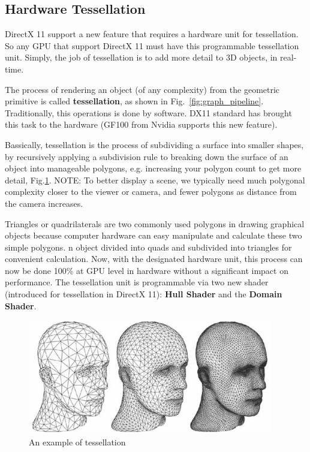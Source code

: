 \subsection{Hardware Tessellation}
\label{sec:tessellation}

DirectX 11 support a new feature that requires a hardware unit for tessellation.
So any GPU that support DirectX 11 must have this programmable tessellation
unit. Simply, the job of tessellation is to add more detail to 3D objects, in
real-time.

\begin{framed}
  The process of rendering an object (of any complexity) from the
  geometric primitive is called {\bf tessellation}, as shown in
  Fig.~\ref{fig:graph_pipeline}. Traditionally, this operations is
  done by software.  DX11 standard has brought this task to the
  hardware (GF100 from Nvidia supports this new feature).
\end{framed}

Bassically, tessellation is the process of subdividing a surface into smaller
shapes, by recursively applying a subdivision rule to breaking down the surface
of an object into manageable polygons, e.g. increasing your polygon count to get
more detail, Fig.\ref{fig:Tessellation_example}. NOTE: To better display a
scene, we typically need much polygonal complexity closer to the viewer or
camera, and fewer polygons as distance from the camera increases.

Triangles or quadrilaterals are two commonly used polygons in drawing graphical
objects because computer hardware can easy manipulate and calculate these two
simple polygons. n object divided into quads and subdivided into triangles for
convenient calculation. Now, with the designated hardware unit, this process can
now be done 100\% at GPU level in hardware without a significant impact on
performance. The tessellation unit is programmable via two new shader
(introduced for tessellation in DirectX 11): {\bf Hull Shader} and the {\bf
Domain Shader}.

\begin{figure}[hbt]
  \centerline{\includegraphics[height=5cm,
    angle=0]{./images/Tessellation_example.eps}}
\caption{An example of tessellation}
\label{fig:Tessellation_example}
\end{figure}


